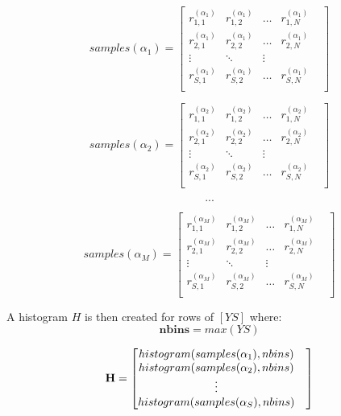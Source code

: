 \documentclass[a4paper, 12pt]{report}
\begin{document}
\[
samples(\alpha_1) = \begin{bmatrix} 
    r^{(\alpha_1)}_{1,1} & r^{(\alpha_1)}_{1,2} & \dots & r^{(\alpha_1)}_{1,N} & \\
    r^{(\alpha_1)}_{2,1} & r^{(\alpha_1)}_{2,2} & \dots & r^{(\alpha_1)}_{2,N} & \\
    \vdots & \ddots & \vdots & \\
    r^{(\alpha_1)}_{S,1} & r^{(\alpha_1)}_{S,2} & \dots & r^{(\alpha_1)}_{S,N} & \\
\end{bmatrix}
\]

\[
samples(\alpha_2) = \begin{bmatrix} 
    r^{(\alpha_2)}_{1,1} & r^{(\alpha_2)}_{1,2} & \dots & r^{(\alpha_2)}_{1,N} & \\
    r^{(\alpha_2)}_{2,1} & r^{(\alpha_2)}_{2,2} & \dots & r^{(\alpha_2)}_{2,N} & \\
    \vdots & \ddots & \vdots & \\
    r^{(\alpha_2)}_{S,1} & r^{(\alpha_2)}_{S,2} & \dots & r^{(\alpha_2)}_{S,N} & \\
\end{bmatrix}
\]

\[
...
\]

\[
samples(\alpha_M) = \begin{bmatrix} 
    r^{(\alpha_M)}_{1,1} & r^{(\alpha_M)}_{1,2} & \dots & r^{(\alpha_M)}_{1,N} & \\
    r^{(\alpha_M)}_{2,1} & r^{(\alpha_M)}_{2,2} & \dots & r^{(\alpha_M)}_{2,N} & \\
    \vdots & \ddots & \vdots & \\
    r^{(\alpha_M)}_{S,1} & r^{(\alpha_M)}_{S,2} & \dots & r^{(\alpha_M)}_{S,N} & \\
\end{bmatrix}
\]

\par A histogram $H$ is then created for rows of $[YS]$ where: 
\begin{equation}
\label{eq:nbins}
\textbf {nbins} = max(YS)
\end{equation}

\[
{\textbf H} = \begin{bmatrix} 
    histogram(samples(\alpha_1), nbins) & \\
    histogram(samples(\alpha_2), nbins) & \\
    \vdots & \\
    histogram(samples(\alpha_S), nbins) & \\
\end{bmatrix}
\]
\end{document}
